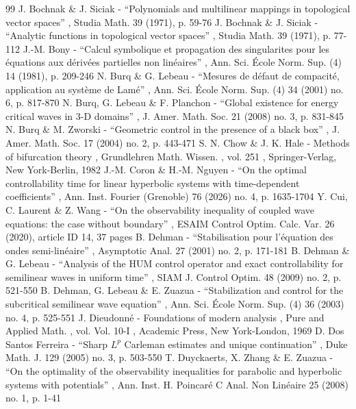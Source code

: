 \documentclass[11pt]{article}
\theoremstyle{definition}
\begin{document}
\begin{thebibliography}{99}
 J. Bochnak \& J. Siciak - “Polynomials and multilinear mappings in topological vector spaces” , Studia Math. 39 (1971), p. 59-76
 J. Bochnak \& J. Siciak - “Analytic functions in topological vector spaces” , Studia Math. 39 (1971), p. 77-112
 J.-M. Bony - “Calcul symbolique et propagation des singularites pour les équations aux dérivées partielles non linéaires” , Ann. Sci. École Norm. Sup. (4) 14 (1981), p. 209-246
 N. Burq \& G. Lebeau - “Mesures de défaut de compacité, application au système de Lamé” , Ann. Sci. École Norm. Sup. (4) 34 (2001) no. 6, p. 817-870
 N. Burq, G. Lebeau \& F. Planchon - “Global existence for energy critical waves in 3-D domains” , J. Amer. Math. Soc. 21 (2008) no. 3, p. 831-845
 N. Burq \& M. Zworski - “Geometric control in the presence of a black box” , J. Amer. Math. Soc. 17 (2004) no. 2, p. 443-471
 S. N. Chow \& J. K. Hale - Methods of bifurcation theory , Grundlehren Math. Wissen. , vol. 251 , Springer-Verlag, New York-Berlin, 1982
 J.-M. Coron \& H.-M. Nguyen - “On the optimal controllability time for linear hyperbolic systems with time-dependent coefficients” , Ann. Inst. Fourier (Grenoble) 76 (2026) no. 4, p. 1635-1704
 Y. Cui, C. Laurent \& Z. Wang - “On the observability inequality of coupled wave equations: the case without boundary” , ESAIM Control Optim. Calc. Var. 26 (2020), article ID 14, 37 pages
 B. Dehman - “Stabilisation pour l’équation des ondes semi-linéaire” , Asymptotic Anal. 27 (2001) no. 2, p. 171-181
 B. Dehman \& G. Lebeau - “Analysis of the HUM control operator and exact controllability for semilinear waves in uniform time” , SIAM J. Control Optim. 48 (2009) no. 2, p. 521-550
 B. Dehman, G. Lebeau \& E. Zuazua - “Stabilization and control for the subcritical semilinear wave equation” , Ann. Sci. École Norm. Sup. (4) 36 (2003) no. 4, p. 525-551
 J. Dieudonné - Foundations of modern analysis , Pure and Applied Math. , vol. Vol. 10-I , Academic Press, New York-London, 1969
 D. Dos Santos Ferreira - “Sharp $L^p$ Carleman estimates and unique continuation” , Duke Math. J. 129 (2005) no. 3, p. 503-550
 T. Duyckaerts, X. Zhang \& E. Zuazua - “On the optimality of the observability inequalities for parabolic and hyperbolic systems with potentials” , Ann. Inst. H. Poincaré C Anal. Non Linéaire 25 (2008) no. 1, p. 1-41

\end{thebibliography}
\end{document}
